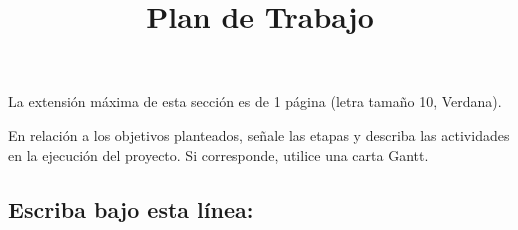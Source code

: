 \documentclass[10pt,prl]{revtex4}
\begin{document}
\title{Plan de Trabajo}
\maketitle

La extensi\'on m\'axima de esta secci\'on es de 1 p\'agina (letra tama\~no 10, Verdana).

En relaci\'on a los objetivos planteados, se\~nale las etapas y describa las actividades en la ejecuci\'on del proyecto. Si corresponde, utilice una carta Gantt.

\maketitle
\subsection{Escriba bajo esta l\'inea:}
\end{document}
